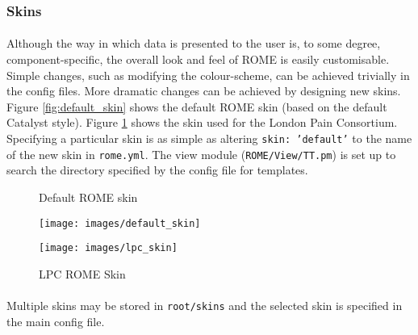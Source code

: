 \subsubsection{Skins}
\label{sec:view_skins}

\paragraph{}
Although the way in which data is presented to the user is, to some degree, component-specific, the overall look and feel of ROME is easily customisable. Simple changes, such as modifying the colour-scheme, can be achieved trivially in the config files. More dramatic changes can be achieved by designing new skins. Figure \ref{fig:default_skin} shows the default ROME skin (based on the default Catalyst style). Figure \ref{fig:lpc_skin} shows the skin used for the London Pain Consortium. Specifying a particular skin is as simple as altering \texttt{skin: 'default'} to the name of the new skin in \texttt{rome.yml}.  The view module (\texttt{ROME/View/TT.pm}) is set up to search the directory specified by the config file for templates.


\clearpage
\begin{figure}
\centering
\caption{Default ROME skin}\label{fig:default_skin}
\texttt{[image: images/default\_skin]}
\centering
\caption{LPC ROME Skin}\label{fig:lpc_skin}
\texttt{[image: images/lpc\_skin]}
\end{figure}

\paragraph{}
Multiple skins may be stored in \texttt{root/skins} and the selected skin is specified in the main config file.


% 
